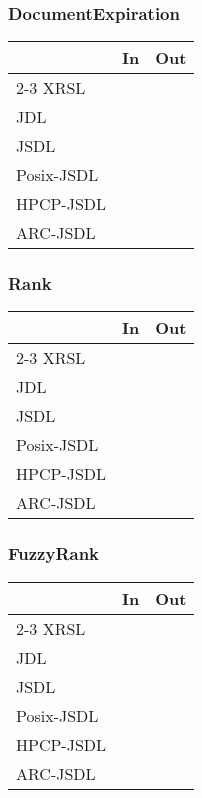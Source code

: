 \documentclass{article}
\newenvironment{inouttabular}%
{\begin{center}\begin{tabular}{l>{\ttfamily\footnotesize}c>{\ttfamily\footnotesize}c}%
\toprule
& \textnormal{\normalsize{In}} & \textnormal{\normalsize{Out}}\\ \cmidrule{2-3}}
{\bottomrule\end{tabular}\end{center}}
\begin{document}
\subsubsection{DocumentExpiration}
\begin{inouttabular}
XRSL & &\\
JDL & &\\
JSDL & &\\
Posix-JSDL & &\\
HPCP-JSDL & &\\
ARC-JSDL & &\\
\end{inouttabular}

\subsubsection{Rank}
\begin{inouttabular}
XRSL & &\\
JDL & &\\
JSDL & &\\
Posix-JSDL & &\\
HPCP-JSDL & &\\
ARC-JSDL & &\\
\end{inouttabular}

\subsubsection{FuzzyRank}
\begin{inouttabular}
XRSL & ~ & ~\\
JDL & ~ & ~\\
JSDL & ~ & ~\\
Posix-JSDL & ~ & ~\\
HPCP-JSDL & ~ & ~\\
ARC-JSDL & ~ & ~\\
\end{inouttabular}
\end{document}

